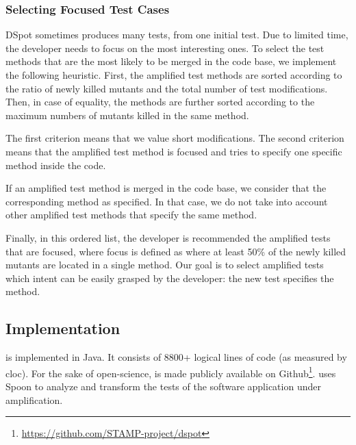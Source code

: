 
\subsubsection{Selecting Focused Test Cases}
\label{subsubsec:test:cases:selection:for:pr}

DSpot  sometimes produces many tests, from one initial test.
Due to limited time, the developer needs to focus on the most interesting ones.
To select the test methods that are the most likely to be merged in the code base, we implement the following  heuristic.
First, the amplified test methods are sorted according to the ratio of newly killed mutants and the total number of test modifications.
Then, in case of equality, the methods are further sorted according to the maximum numbers of mutants killed in the same method.

The first criterion means that we value short modifications.
The second criterion means that the amplified test method is focused and tries to specify one specific method inside the code.

If an amplified test method is merged in the code base, we consider that the corresponding method as specified. In that case, we do not take into account other amplified test methods that specify the same method.

Finally, in this ordered list, the developer is recommended the amplified tests that are focused, where focus is defined as where at least 50\% of the newly killed mutants are located in a single method. Our goal is to select amplified tests which intent can be easily grasped by the developer: the new test specifies the method.

\subsection{Implementation}

\dspot is implemented in Java.
It consists of 8800+ logical lines of code (as measured by cloc).
For the sake of open-science, \dspot is made publicly available on Github\footnote{\url{https://github.com/STAMP-project/dspot}}.
\dspot uses Spoon\cite{pawlak:hal-01169705} to analyze and transform the tests of the software application under amplification.

